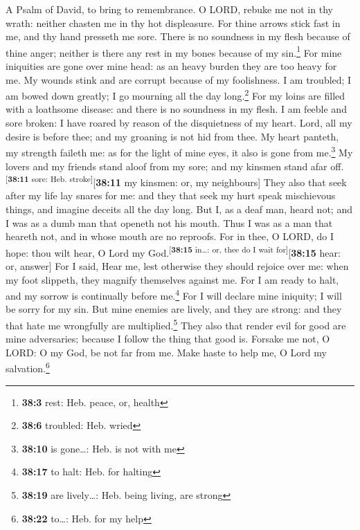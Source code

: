 A Psalm of David, to bring to remembrance.  O LORD, rebuke
me not in thy wrath: neither chasten me in thy hot displeasure.
 For thine arrows stick fast in me, and thy hand presseth
me sore.  There is no soundness in my flesh because of
thine anger; neither is there any rest in my bones because of my
sin.\footnote{\textbf{38:3} rest: Heb. peace, or, health} 
For mine iniquities are gone over mine head: as an heavy burden they are
too heavy for me.  My wounds stink and are corrupt because
of my foolishness.  I am troubled; I am bowed down
greatly; I go mourning all the day long.\footnote{\textbf{38:6}
  troubled: Heb. wried}  For my loins are filled with a
loathsome disease: and there is no soundness in my flesh. 
I am feeble and sore broken: I have roared by reason of the disquietness
of my heart.  Lord, all my desire is before thee; and my
groaning is not hid from thee.  My heart panteth, my
strength faileth me: as for the light of mine eyes, it also is gone from
me.\footnote{\textbf{38:10} is gone\ldots: Heb. is not with me}
 My lovers and my friends stand aloof from my sore; and
my kinsmen stand afar off.\textsuperscript{{[}\textbf{38:11} sore: Heb.
stroke{]}}{[}\textbf{38:11} my kinsmen: or, my neighbours{]}
 They also that seek after my life lay snares for me: and
they that seek my hurt speak mischievous things, and imagine deceits all
the day long.  But I, as a deaf man, heard not; and I was
as a dumb man that openeth not his mouth.  Thus I was as
a man that heareth not, and in whose mouth are no reproofs.
 For in thee, O LORD, do I hope: thou wilt hear, O Lord
my God.\textsuperscript{{[}\textbf{38:15} in\ldots: or, thee do I wait
for{]}}{[}\textbf{38:15} hear: or, answer{]}  For I said,
Hear me, lest otherwise they should rejoice over me: when my foot
slippeth, they magnify themselves against me.  For I am
ready to halt, and my sorrow is continually before me.\footnote{\textbf{38:17}
  to halt: Heb. for halting}  For I will declare mine
iniquity; I will be sorry for my sin.  But mine enemies
are lively, and they are strong: and they that hate me wrongfully are
multiplied.\footnote{\textbf{38:19} are lively\ldots: Heb. being living,
  are strong}  They also that render evil for good are
mine adversaries; because I follow the thing that good is.
 Forsake me not, O LORD: O my God, be not far from me.
 Make haste to help me, O Lord my salvation.\footnote{\textbf{38:22}
  to\ldots: Heb. for my help}

